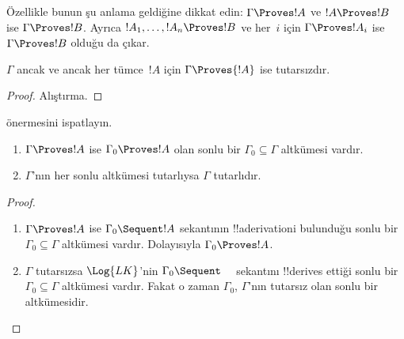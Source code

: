 \documentclass[../../../include/open-logic-section]{subfiles}
\begin{document}
Özellikle bunun şu anlama geldiğine dikkat edin: $\Gamma \Proves !A$ ve
$!A \Proves !B$ ise $\Gamma \Proves !B$. Ayrıca $!A_1, \dots, !A_n
\Proves !B$ ve her~$i$ için $\Gamma \Proves !A_i$ ise $\Gamma \Proves !B$
olduğu da çıkar.

\begin{prop}
$\Gamma$ ancak ve ancak her tümce~$!A$ için $\Gamma \Proves {!A}$ ise
tutarsızdır.
\end{prop}

\begin{proof}
Alıştırma.
\end{proof}

\begin{prob}
 önermesini ispatlayın.
\end{prob}

\begin{prop}[Tıkızlık]
  \begin{enumerate}
  \item $\Gamma \Proves !A$ ise $\Gamma_0 \Proves !A$ olan sonlu bir
    $\Gamma_0 \subseteq \Gamma$ altkümesi vardır.
  \item $\Gamma$'nın her sonlu altkümesi tutarlıysa $\Gamma$ tutarlıdır.
  \end{enumerate}
\end{prop}

\begin{proof}
  \begin{enumerate}
    \item $\Gamma \Proves !A$ ise $\Gamma_0 \Sequent !A$ sekantının
      !!a{derivation}{}i bulunduğu sonlu bir $\Gamma_0 \subseteq \Gamma$
      altkümesi vardır. Dolayısıyla $\Gamma_0 \Proves !A$.
    \item $\Gamma$ tutarsızsa $\Log{LK}$'nin
      $\Gamma_0 \Sequent \quad$ sekantını !!{derive}s ettiği sonlu bir
      $\Gamma_0 \subseteq \Gamma$ altkümesi vardır. Fakat o zaman
      $\Gamma_0$, $\Gamma$'nın tutarsız olan sonlu bir altkümesidir.
  \end{enumerate}
\end{proof}
\end{document}
